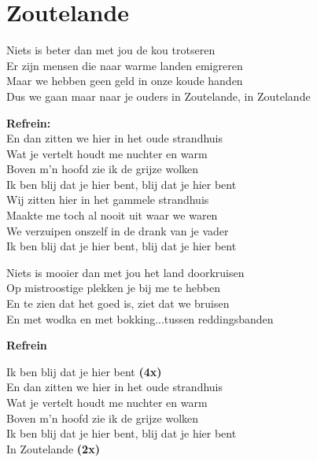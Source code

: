 \section{Zoutelande}
Niets is beter dan met jou de kou trotseren\\
Er zijn mensen die naar warme landen emigreren\\
Maar we hebben geen geld in onze koude handen\\
Dus we gaan maar naar je ouders in Zoutelande, in Zoutelande

\textbf{Refrein:}\\
En dan zitten we hier in het oude strandhuis\\
Wat je vertelt houdt me nuchter en warm\\
Boven m’n hoofd zie ik de grijze wolken\\
Ik ben blij dat je hier bent, blij dat je hier bent\\
Wij zitten hier in het gammele strandhuis\\
Maakte me toch al nooit uit waar we waren\\
We verzuipen onszelf in de drank van je vader\\
Ik ben blij dat je hier bent, blij dat je hier bent

Niets is mooier dan met jou het land doorkruisen\\
Op mistroostige plekken je bij me te hebben\\
En te zien dat het goed is, ziet dat we bruisen\\
En met wodka en met bokking...tussen reddingsbanden

\textbf{Refrein}

Ik ben blij dat je hier bent \textbf{(4x)}\\
En dan zitten we hier in het oude strandhuis\\
Wat je vertelt houdt me nuchter en warm\\
Boven m’n hoofd zie ik de grijze wolken\\
Ik ben blij dat je hier bent, blij dat je hier bent\\
In Zoutelande \textbf{(2x)}
